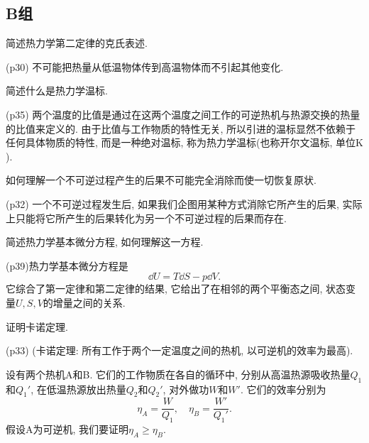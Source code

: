 \subsection{B组}
\begin{questions}
  \question 简述热力学第二定律的克氏表述.
  \begin{solution}
    (p30) 不可能把热量从低温物体传到高温物体而不引起其他变化.
  \end{solution}
  \question 简述什么是热力学温标.
  \begin{solution}
    (p35) 两个温度的比值是通过在这两个温度之间工作的可逆热机与热源交换的热量的比值来定义的. 由于比值与工作物质的特性无关, 所以引进的温标显然不依赖于任何具体物质的特性, 而是一种绝对温标, 称为热力学温标(也称开尔文温标, 单位$\unit{\K}$).
  \end{solution}
  \question 如何理解一个不可逆过程产生的后果不可能完全消除而使一切恢复原状.
  \begin{solution}
    (p32) 一个不可逆过程发生后, 如果我们企图用某种方式消除它所产生的后果, 实际上只能将它所产生的后果转化为另一个不可逆过程的后果而存在.
  \end{solution}
  \question 简述热力学基本微分方程, 如何理解这一方程.
  \begin{solution}
    (p39)热力学基本微分方程是
    \begin{equation}
      \dd U = T\dd S - p\dd V.
    \end{equation}
    它综合了第一定律和第二定律的结果, 它给出了在相邻的两个平衡态之间, 状态变量$U, S, V$的增量之间的关系.
  \end{solution}
  \question 证明卡诺定理.
  \begin{solution}
    (p33) (卡诺定理: 所有工作于两个一定温度之间的热机, 以可逆机的效率为最高).

    设有两个热机A和B. 它们的工作物质在各自的循环中, 分别从高温热源吸收热量$Q_1$和$Q_1'$, 在低温热源放出热量$Q_2$和$Q_2'$, 对外做功$W$和$W'$. 它们的效率分别为
    \begin{equation}
      \eta_A = \frac{W}{Q_1}, \quad \eta_B = \frac{W'}{Q_1'}.
    \end{equation}
    假设A为可逆机, 我们要证明$\eta_A\ge\eta_B$.


\end{solution}
\end{questions}

